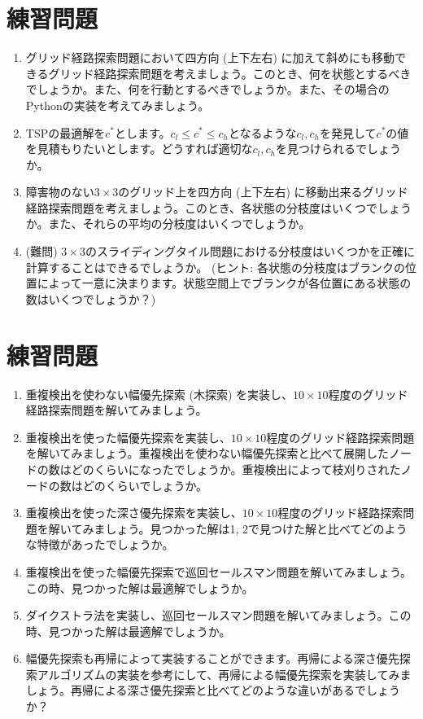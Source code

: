 
\section{練習問題}

\begin{enumerate}
  \item グリッド経路探索問題において四方向 (上下左右) に加えて斜めにも移動できるグリッド経路探索問題を考えましょう。このとき、何を状態とするべきでしょうか。また、何を行動とするべきでしょうか。また、その場合のPythonの実装を考えてみましょう。

  \item TSPの最適解を$c^*$とします。$c_l \leq c^* \leq c_h$となるような$c_l, c_h$を発見して$c^*$の値を見積もりたいとします。どうすれば適切な$c_l, c_h$を見つけられるでしょうか。

  \item 障害物のない$3 \times 3$のグリッド上を四方向 (上下左右) に移動出来るグリッド経路探索問題を考えましょう。このとき、各状態の分枝度はいくつでしょうか。また、それらの平均の分枝度はいくつでしょうか。

  \item (難問) $3 \times 3$のスライディングタイル問題における分枝度はいくつかを正確に計算することはできるでしょうか。
  (ヒント: 各状態の分枝度はブランクの位置によって一意に決まります。状態空間上でブランクが各位置にある状態の数はいくつでしょうか？)
  
\end{enumerate}


\section{練習問題}

\begin{enumerate}
	\item 重複検出を使わない幅優先探索 (木探索) を実装し、$10 \times 10$程度のグリッド経路探索問題を解いてみましょう。

	\item 重複検出を使った幅優先探索を実装し、$10 \times 10$程度のグリッド経路探索問題を解いてみましょう。重複検出を使わない幅優先探索と比べて展開したノードの数はどのくらいになったでしょうか。重複検出によって枝刈りされたノードの数はどのくらいでしょうか。
	
	\item 重複検出を使った深さ優先探索を実装し、$10 \times 10$程度のグリッド経路探索問題を解いてみましょう。見つかった解は1, 2で見つけた解と比べてどのような特徴があったでしょうか。
	
	\item 重複検出を使った幅優先探索で巡回セールスマン問題を解いてみましょう。この時、見つかった解は最適解でしょうか。
	
	\item ダイクストラ法を実装し、巡回セールスマン問題を解いてみましょう。この時、見つかった解は最適解でしょうか。
	
	\item 幅優先探索も再帰によって実装することができます。再帰による深さ優先探索アルゴリズムの実装を参考にして、再帰による幅優先探索を実装してみましょう。再帰による深さ優先探索と比べてどのような違いがあるでしょうか？
\end{enumerate}



